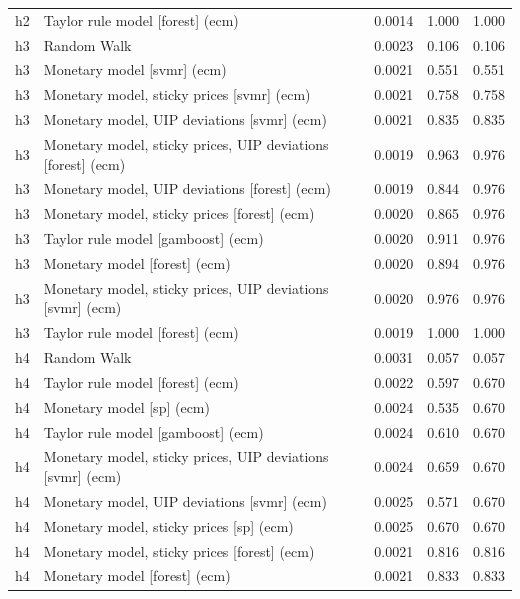 \begin{ThreePartTable}
\begin{longtable}[t]{cp{5.5cm}ccc}
h2 & \raggedright Taylor rule model [forest] (ecm) & 0.0014 & 1.000 & 1.000\\
\addlinespace
h3 & \raggedright Random Walk & 0.0023 & 0.106 & 0.106\\
h3 & \raggedright Monetary model [svmr] (ecm) & 0.0021 & 0.551 & 0.551\\
h3 & \raggedright Monetary model, sticky prices [svmr] (ecm) & 0.0021 & 0.758 & 0.758\\
h3 & \raggedright Monetary model, UIP deviations [svmr] (ecm) & 0.0021 & 0.835 & 0.835\\
h3 & \raggedright Monetary model, sticky prices, UIP deviations [forest] (ecm) & 0.0019 & 0.963 & 0.976\\
h3 & \raggedright Monetary model, UIP deviations [forest] (ecm) & 0.0019 & 0.844 & 0.976\\
h3 & \raggedright Monetary model, sticky prices [forest] (ecm) & 0.0020 & 0.865 & 0.976\\
h3 & \raggedright Taylor rule model [gamboost] (ecm) & 0.0020 & 0.911 & 0.976\\
h3 & \raggedright Monetary model [forest] (ecm) & 0.0020 & 0.894 & 0.976\\
h3 & \raggedright Monetary model, sticky prices, UIP deviations [svmr] (ecm) & 0.0020 & 0.976 & 0.976\\
h3 & \raggedright Taylor rule model [forest] (ecm) & 0.0019 & 1.000 & 1.000\\
\addlinespace
h4 & \raggedright Random Walk & 0.0031 & 0.057 & 0.057\\
h4 & \raggedright Taylor rule model [forest] (ecm) & 0.0022 & 0.597 & 0.670\\
h4 & \raggedright Monetary model [sp] (ecm) & 0.0024 & 0.535 & 0.670\\
h4 & \raggedright Taylor rule model [gamboost] (ecm) & 0.0024 & 0.610 & 0.670\\
h4 & \raggedright Monetary model, sticky prices, UIP deviations [svmr] (ecm) & 0.0024 & 0.659 & 0.670\\
h4 & \raggedright Monetary model, UIP deviations [svmr] (ecm) & 0.0025 & 0.571 & 0.670\\
h4 & \raggedright Monetary model, sticky prices [sp] (ecm) & 0.0025 & 0.670 & 0.670\\
h4 & \raggedright Monetary model, sticky prices [forest] (ecm) & 0.0021 & 0.816 & 0.816\\
h4 & \raggedright Monetary model [forest] (ecm) & 0.0021 & 0.833 & 0.833\\

\end{longtable}
\end{ThreePartTable}
